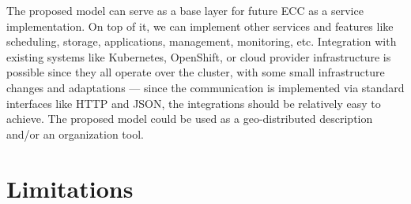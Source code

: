 The proposed model can serve as a base layer for future ECC as a service implementation. On top of it, we can implement other services and features like scheduling, storage, applications, management, monitoring, etc. Integration with existing systems like Kubernetes, OpenShift, or cloud provider infrastructure is possible since they all operate over the cluster, with some small infrastructure changes and adaptations --- since the communication is implemented via standard interfaces like HTTP and JSON, the integrations should be relatively easy to achieve. The proposed model could be used as a geo-distributed description and/or an  organization tool.
%
%
\section{Limitations}\label{sec:limitations}
%
%